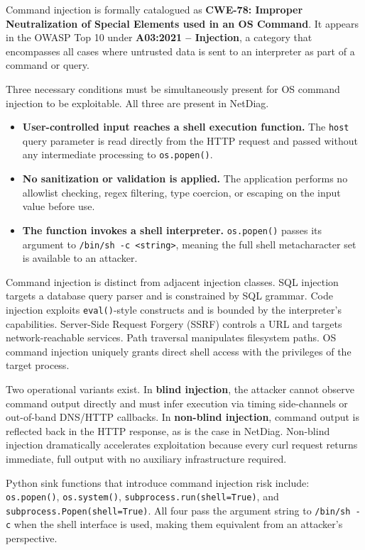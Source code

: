 Command injection is formally catalogued as \textbf{CWE-78: Improper Neutralization of Special Elements used in an OS Command}. It appears in the OWASP Top 10 under \textbf{A03:2021 -- Injection}, a category that encompasses all cases where untrusted data is sent to an interpreter as part of a command or query.

Three necessary conditions must be simultaneously present for OS command injection to be exploitable. All three are present in NetDiag.

\begin{itemize}
    \item \textbf{User-controlled input reaches a shell execution function.} The \texttt{host} query parameter is read directly from the HTTP request and passed without any intermediate processing to \texttt{os.popen()}.
    \item \textbf{No sanitization or validation is applied.} The application performs no allowlist checking, regex filtering, type coercion, or escaping on the input value before use.
    \item \textbf{The function invokes a shell interpreter.} \texttt{os.popen()} passes its argument to \texttt{/bin/sh -c <string>}, meaning the full shell metacharacter set is available to an attacker.
\end{itemize}

Command injection is distinct from adjacent injection classes. SQL injection targets a database query parser and is constrained by SQL grammar. Code injection exploits \texttt{eval()}-style constructs and is bounded by the interpreter's capabilities. Server-Side Request Forgery (SSRF) controls a URL and targets network-reachable services. Path traversal manipulates filesystem paths. OS command injection uniquely grants direct shell access with the privileges of the target process.

Two operational variants exist. In \textbf{blind injection}, the attacker cannot observe command output directly and must infer execution via timing side-channels or out-of-band DNS/HTTP callbacks. In \textbf{non-blind injection}, command output is reflected back in the HTTP response, as is the case in NetDiag. Non-blind injection dramatically accelerates exploitation because every curl request returns immediate, full output with no auxiliary infrastructure required.

Python sink functions that introduce command injection risk include: \texttt{os.popen()}, \texttt{os.system()}, \texttt{subprocess.run(shell=True)}, and \texttt{subprocess.Popen(shell=True)}. All four pass the argument string to \texttt{/bin/sh -c} when the shell interface is used, making them equivalent from an attacker's perspective.

